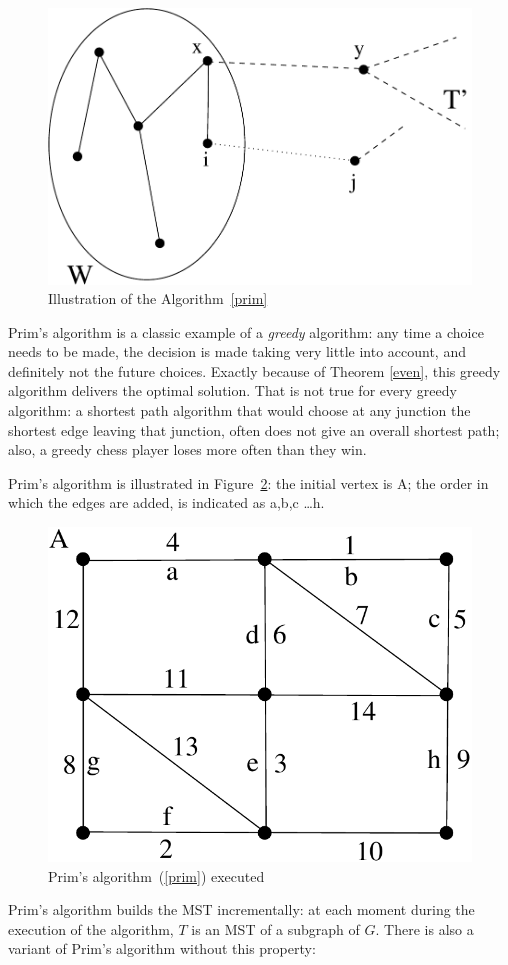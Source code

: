 \begin{figure}[ht]
\begin{center}
\includegraphics[width=0.4\linewidth,keepaspectratio]{prim2}
\end{center}
\caption{Illustration of the Algorithm~\ref{prim} \label{prim2}}
\end{figure}


Prim's algorithm is a classic example of a {\em greedy} algorithm: any
time a choice needs to be made, the decision is made taking very
little into account, and definitely not the future choices. Exactly
because of Theorem \ref{even}, this greedy algorithm delivers the
optimal solution. That is not true for every greedy algorithm: a
shortest path algorithm that would choose at any junction the shortest
edge leaving that junction, often does not give an overall shortest
path; also, a greedy chess player loses more often than they win.

Prim's algorithm is illustrated in Figure~\ref{prim1}: the initial
vertex is A; the order in which the edges are added, is indicated as
a,b,c \ldots h.

\begin{figure}[ht]
\begin{center}
\includegraphics[width=0.3\linewidth,keepaspectratio]{prim1} %
\end{center}
\caption{Prim's algorithm~(\ref{prim}) executed \label{prim1}}
\end{figure}


Prim's algorithm builds the MST incrementally: at each moment during
the execution of the algorithm, $T$ is an MST of a subgraph of
$G$. There is also a variant of Prim's algorithm without this
property:


